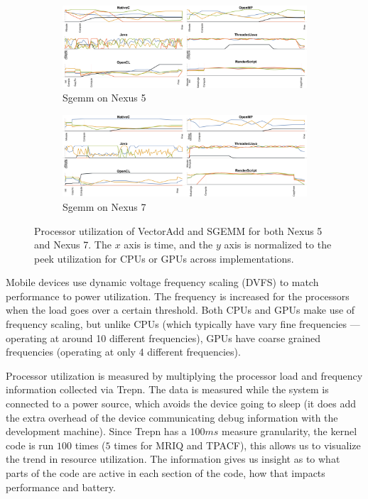 \begin{figure}
  \begin{subfigure}[b]{0.85\textwidth}
       \centering
       \includegraphics[width=\textwidth]{data/load_sgemm_nexus5.pdf}
       \vspace{-5mm}
       \caption{Sgemm on Nexus 5}\label{fig:Sgemm5}
   \end{subfigure}
  \begin{subfigure}[b]{0.85\textwidth}
       \centering
       \includegraphics[width=\textwidth]{data/load_sgemm_nexus7.pdf}
       \vspace{-5mm}
       \caption{Sgemm on Nexus 7}\label{fig:Sgemm7}
   \end{subfigure}


  \caption{Processor utilization of VectorAdd and SGEMM for both Nexus 5 and Nexus 7. The $x$ axis is time, and the $y$ axis is normalized to the peek utilization for CPUs or GPUs across implementations.}
  \label{fig:loadVecAddSgemm}
\end{figure}

Mobile devices use dynamic voltage frequency scaling (DVFS)
  to match performance to power utilization.
The frequency is increased for the processors when the load goes over a certain
  threshold.
Both CPUs and GPUs make use of frequency scaling, but unlike CPUs (which typically
  have vary fine frequencies --- operating at around 10 different frequencies), GPUs
  have coarse grained frequencies (operating at only 4 different frequencies).  

Processor utilization is measured by multiplying the processor
  load and frequency information collected via Trepn.
The data is measured while the system is connected to a
  power source, which avoids the device going to sleep (it does add the
  extra overhead of the device communicating debug information with the development
  machine).
Since Trepn has a $100ms$ measure granularity, the kernel code is run $100$ times
  ($5$ times for MRIQ and TPACF), this allows us to visualize the trend in resource
  utilization.
The information gives us insight as to what parts of the code are active in each
	section of the code, how that impacts performance and battery.


